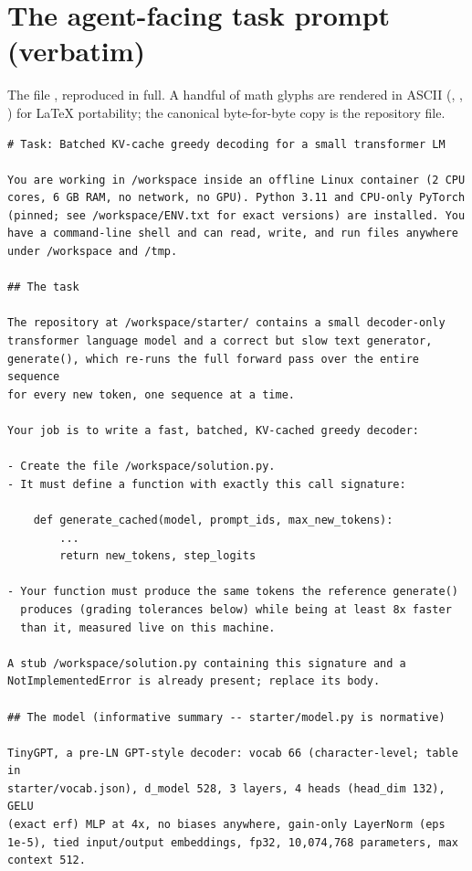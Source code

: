 \documentclass[11pt]{article}
\newcommand{\pc}[1]{\texttt{\detokenize{#1}}}
\begin{document}
\appendix
\section{The agent-facing task prompt (verbatim)}
\label{app:prompt}

The file \pc{env/task_prompt.md}, reproduced in full. A handful of math glyphs are
rendered in ASCII (\pc{<=}, \pc{>=}, \pc{->}) for LaTeX portability; the canonical
byte-for-byte copy is the repository file.

\begin{lstlisting}[style=plain]
# Task: Batched KV-cache greedy decoding for a small transformer LM

You are working in /workspace inside an offline Linux container (2 CPU
cores, 6 GB RAM, no network, no GPU). Python 3.11 and CPU-only PyTorch
(pinned; see /workspace/ENV.txt for exact versions) are installed. You
have a command-line shell and can read, write, and run files anywhere
under /workspace and /tmp.

## The task

The repository at /workspace/starter/ contains a small decoder-only
transformer language model and a correct but slow text generator,
generate(), which re-runs the full forward pass over the entire sequence
for every new token, one sequence at a time.

Your job is to write a fast, batched, KV-cached greedy decoder:

- Create the file /workspace/solution.py.
- It must define a function with exactly this call signature:

    def generate_cached(model, prompt_ids, max_new_tokens):
        ...
        return new_tokens, step_logits

- Your function must produce the same tokens the reference generate()
  produces (grading tolerances below) while being at least 8x faster
  than it, measured live on this machine.

A stub /workspace/solution.py containing this signature and a
NotImplementedError is already present; replace its body.

## The model (informative summary -- starter/model.py is normative)

TinyGPT, a pre-LN GPT-style decoder: vocab 66 (character-level; table in
starter/vocab.json), d_model 528, 3 layers, 4 heads (head_dim 132), GELU
(exact erf) MLP at 4x, no biases anywhere, gain-only LayerNorm (eps
1e-5), tied input/output embeddings, fp32, 10,074,768 parameters, max
context 512.


\end{lstlisting}
\end{document}
